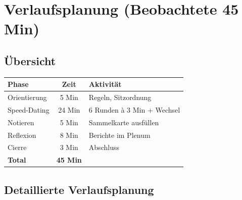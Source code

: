 \documentclass[11pt, a4paper]{article}
\begin{document}

\section{Verlaufsplanung (Beobachtete 45 Min)}

\subsection{Übersicht}

\begin{center}
\begin{tabular}{|l|c|l|}
    \hline
    \textbf{Phase} & \textbf{Zeit} & \textbf{Aktivität} \\
    \hline
    Orientierung & 5 Min & Regeln, Sitzordnung \\
    \hline
    Speed-Dating & 24 Min & 6 Runden à 3 Min + Wechsel \\
    \hline
    Notieren & 5 Min & Sammelkarte ausfüllen \\
    \hline
    Reflexion & 8 Min & Berichte im Plenum \\
    \hline
    Cierre & 3 Min & Abschluss \\
    \hline
    \textbf{Total} & \textbf{45 Min} & \\
    \hline
\end{tabular}
\end{center}

\subsection{Detaillierte Verlaufsplanung}
\end{document}
